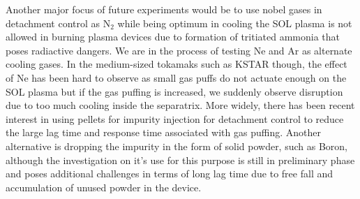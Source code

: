 Another major focus of future experiments would be to use nobel gases in detachment control as N$_2$ while being optimum in cooling the SOL plasma is not allowed in burning plasma devices due to formation of tritiated ammonia that poses radiactive dangers.
We are in the process of testing Ne and Ar as alternate cooling gases.
In the medium-sized tokamaks such as KSTAR though, the effect of Ne has been hard to observe as small gas puffs do not actuate enough on the \ac{SOL} plasma but if the gas puffing is increased, we suddenly observe disruption due to too much cooling inside the separatrix.
More widely, there has been recent interest in using pellets for impurity injection for detachment control to reduce the large lag time and response time associated with gas puffing.
Another alternative is dropping the impurity in the form of solid powder, such as Boron, although the investigation on it's use for this purpose is still in preliminary phase and poses additional challenges in terms of long lag time due to free fall and accumulation of unused powder in the device.